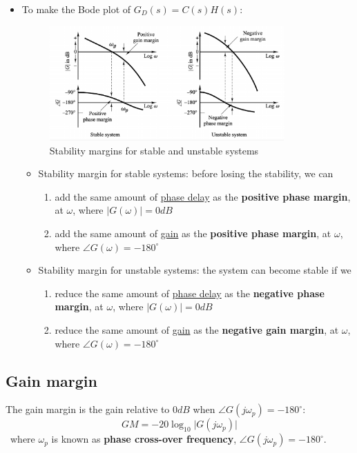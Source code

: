 \begin{itemize}
    \item To make the Bode plot of $G_{D}(s) = C(s)H(s)$:
        \begin{figure}[H] 
            \centering
            \includegraphics[width=0.85\textwidth]{images/margin.pdf}
            \caption{Stability margins for stable and unstable systems}
        \end{figure}
        
    \begin{itemize}
        \item Stability margin for stable systems: before losing the stability, we can 
        \begin{enumerate}
            \item add the same amount of \underline{phase delay} as the \textbf{positive phase margin}, at $\omega$, where $\lvert G(\omega)\rvert=0dB$
            \item add the same amount of \underline{gain} as the \textbf{positive phase margin}, at $\omega$, where $\angle G(\omega)=-180^{\circ}$
        \end{enumerate}
    
        \item Stability margin for unstable systems: the system can become stable if we 
            \begin{enumerate}
                \item reduce the same amount of \underline{phase delay} as the \textbf{negative phase margin}, at $\omega$, where $\lvert G(\omega)\rvert=0dB$
                \item reduce the same amount of \underline{gain} as the \textbf{negative gain margin}, at $\omega$, where $\angle G(\omega)=-180^{\circ}$
            \end{enumerate}
    \end{itemize}
\end{itemize}

\subsection{Gain margin}
The gain margin is the gain relative to $0dB$ when $\angle G(j\omega_{p}) = -180^{\circ}$:
 \[ GM = -20\log_{10}\lvert G(j\omega_{p})\rvert\]
 \ where $\omega_{p}$ is known as \textbf{phase cross-over frequency}, $\angle G(j\omega_{p}) = -180^{\circ}$. 


